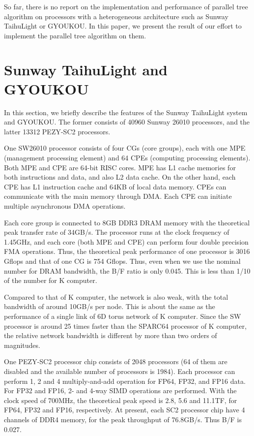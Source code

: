 \documentclass[conference]{IEEEtran}
\begin{document}
So far, there is no report on the implementation and performance of
parallel tree algorithm on processors with a heterogeneous
architecture such as Sunway TaihuLight or GYOUKOU.  In this paper, we
present the result of our effort to implement the parallel tree
algorithm on them.


\section{Sunway TaihuLight and GYOUKOU}

In this section, we briefly describe the features of the Sunway
TaihuLight system and GYOUKOU. The former consists of 40960 Sunway 26010
processors, and the latter 13312 PEZY-SC2 processors. 

One SW26010 processor consists of four  CGs (core groups), each with one
MPE (management processing element) and 64 CPEs (computing processing
elements). Both MPE and CPE are 64-bit RISC cores. MPE has L1 cache
memories for  both instructions and data, and also L2 data cache. On
the other hand, each CPE has L1 instruction cache and 64KB of local
data memory. CPEs can communicate with the main memory through DMA.
Each CPE can initiate multiple asynchronous DMA operations. 

Each core group is connected to 8GB DDR3 DRAM memory with the theoretical
peak transfer rate of 34GB/s. The processor runs at the clock
frequency of 1.45GHz, and each core (both MPE and CPE) can perform
four double precision FMA operations. Thus, the theoretical peak
performance of one processor is 3016 Gflops and that of one CG is 754
Gflops. Thus, even when we use the nominal number for DRAM bandwidth,
the B/F ratio is only 0.045. This is less than 1/10 of the number for
K computer.

Compared to that of K computer, the network is also  weak,
with the total bandwidth of around 10GB/s per node. This is about the
same as the performance of a single link of 6D torus network of K
computer. Since the SW processor is around 25 times faster than the
SPARC64 processor of K computer, the relative network bandwidth is
different by  more than two orders of magnitudes.

One PEZY-SC2 processor chip consists of  2048 processors (64
of them are disabled and the available number of processors is
1984). Each processor can perform 1, 2 and 4 multiply-and-add
operation for FP64, FP32, and FP16 data. For FP32 and FP16, 2- and
4-way SIMD operations are performed.  With the clock speed of 700MHz,
the theoretical peak speed is 2.8, 5.6 and 11.1TF, for FP64, FP32 and
FP16, respectively. At present, each SC2 processor chip have 4 channels of
DDR4 memory, for the peak throughput of 76.8GB/s. Thus B/F is 0.027.
\end{document}
